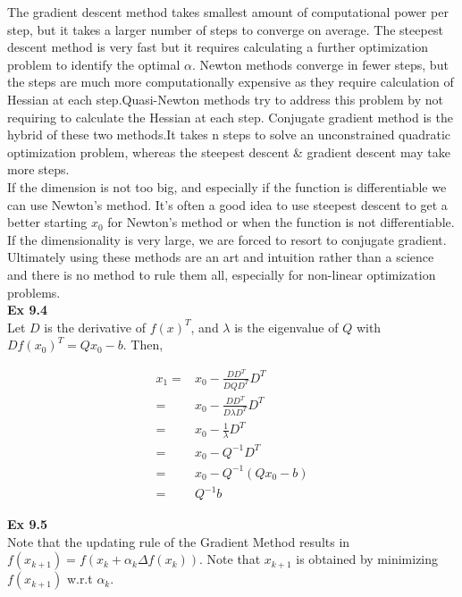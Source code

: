 \documentclass[letterpaper,12pt]{article}
\theoremstyle{definition}
\begin{document}
	The gradient descent method takes smallest amount of computational power per step, but it takes a larger number of steps to converge on average. The steepest descent method is very fast but it requires calculating a further optimization problem to identify the optimal $\alpha$. Newton methods converge in fewer steps, but the steps are much more computationally expensive as they require calculation of Hessian at each step.Quasi-Newton methods try to address this problem by not requiring to calculate the Hessian at each step.  Conjugate gradient method is the hybrid of these  two methods.It takes n steps to solve an unconstrained quadratic optimization problem, whereas the steepest descent \& gradient descent may take more steps.\\

	If the dimension is not too big, and especially if the function is differentiable we can use Newton's method. It's often a good idea to use steepest descent to get a better starting $x_0$ for Newton's method or when the function is not differentiable. If the dimensionality is very large, we are forced to resort to conjugate gradient.\\

	Ultimately using these methods are an art and intuition rather than a science and there is no method to rule them all, especially for non-linear optimization problems.\\

\textbf{Ex 9.4} \\
Let $D$ is the derivative of $f(x)^T$, and $\lambda$ is the eigenvalue of $Q$ with $Df(x_0)^T = Q x_0 - b$. Then,

\begin{align*}
  x_1 =& x_0 - \frac{D  D^T}{DQD^T} D^T \\
      =& x_0 - \frac{D D^T}{D \lambda D^T} D^T \\
      =& x_0 - \frac{1}{\lambda} D^T \\
      =& x_0 - Q^{-1} D^T \\
      =& x_0 - Q^{-1} (Q x_0 -b) \\
      =& Q^{-1}b
\end{align*}

\textbf{Ex 9.5} \\
Note that the updating rule of the Gradient Method results in  $f(x_{k+1}) = f(x_k + \alpha_k \Delta f(x_k) )$. Note that $x_{k+1}$ is obtained by minimizing $f(x_{k+1})$ w.r.t $\alpha_k$.\\
\end{document}

